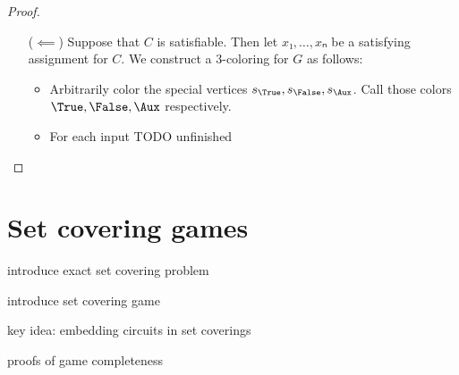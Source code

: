 \begin{proof}
\begin{itemize}
    \item[(\(⟸\))] Suppose that \(C\) is satisfiable.  Then let
      \(x₁,\dotsc,xₙ\) be a satisfying assignment for \(C\).  We construct a
      3-coloring for \(G\) as follows:
      \begin{itemize}
        \item Arbitrarily color the special vertices
          \(s_\True,s_\False,s_\Aux\).  Call those colors \(\True,\False,\Aux\)
          respectively.
        \item For each input TODO unfinished
      \end{itemize}


  \end{itemize}


\end{proof}



\section{Set covering games}

introduce exact set covering problem

introduce set covering game

key idea: embedding circuits in set coverings

proofs of game completeness
